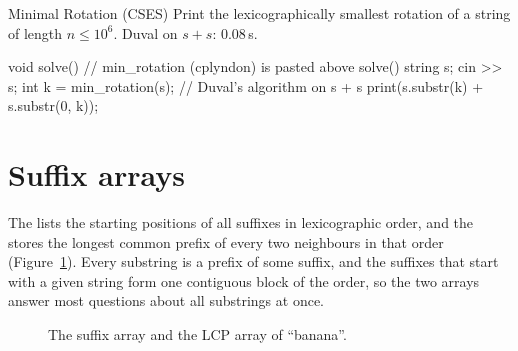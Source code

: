 
\begin{problem}{Minimal Rotation (CSES)}
Print the lexicographically smallest rotation of a string of length $n \le 10^6$.
\solution Duval on $s + s$: 0.08\,s.
\end{problem}

\begin{code}
void solve() {  // min_rotation (cplyndon) is pasted above solve()
    string s;
    cin >> s;
    int k = min_rotation(s);  // Duval's algorithm on s + s
    print(s.substr(k) + s.substr(0, k));
}
\end{code}

\section[Suffix arrays]{Suffix arrays \hfill \ioi}\label{sec:suffixarray}

The  lists the starting positions of all suffixes in lexicographic order, and the  stores the longest
common prefix of every two neighbours in that order (Figure~\ref{fig:suffixarray}). Every substring is a prefix of some suffix, and the
suffixes that start with a given string form one contiguous block of the order, so the two arrays answer most questions about all
substrings at once.

\begin{figure}[htbp]
\centering
{}
\caption{The suffix array and the LCP array of ``banana''.}
\label{fig:suffixarray}
\end{figure}

